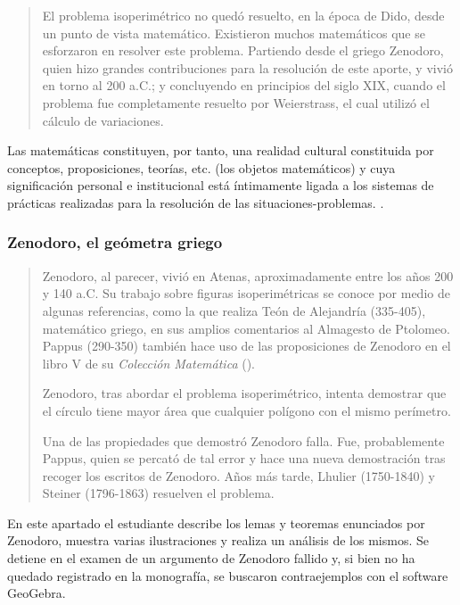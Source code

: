 \begin{quote}
	El problema isoperimétrico no quedó resuelto, en la época de Dido, desde un punto de vista matemático. Existieron muchos matemáticos que se esforzaron en resolver este problema. Partiendo desde el griego Zenodoro, quien hizo grandes contribuciones para la resolución de este aporte, y vivió en torno al 200 a.C.; y concluyendo en principios del siglo XIX, cuando el problema fue completamente resuelto por Weierstrass, el cual utilizó el cálculo de variaciones.
\end{quote}
\vspace{1em}

Las matemáticas constituyen, por tanto, una realidad cultural constituida por conceptos, proposiciones, teorías, etc. (los objetos matemáticos) y cuya significación personal e institucional está íntimamente ligada a los sistemas de prácticas realizadas para la resolución de las situaciones-problemas. \textcite{godino2003}.

\subsubsection{Zenodoro, el geómetra griego}

\begin{quote}
	Zenodoro, al parecer, vivió en Atenas, aproximadamente entre los años 200 y 140 a.C. Su trabajo sobre figuras isoperimétricas se conoce por medio de algunas referencias, como la que realiza Teón de Alejandría (335-405), matemático griego, en sus amplios comentarios al Almagesto de Ptolomeo. Pappus (290-350) también hace uso de las proposiciones de Zenodoro en el libro V de su \textit{Colección Matemática} (\textcite{herrero2011}).
	
	Zenodoro, tras abordar el problema isoperimétrico, intenta demostrar que el círculo tiene mayor área que cualquier polígono con el mismo perímetro.
	
	Una de las propiedades que demostró Zenodoro falla. Fue, probablemente Pappus, quien se percató de tal error y hace una nueva demostración tras recoger los escritos de Zenodoro. Años más tarde, Lhulier (1750-1840) y Steiner (1796-1863) resuelven el problema.
\end{quote}
\vspace{1em}

En este apartado el estudiante describe los lemas y teoremas enunciados por Zenodoro, muestra varias ilustraciones y realiza un análisis de los mismos. Se detiene en el examen de un argumento de Zenodoro fallido y, si bien no ha quedado registrado en la monografía, se buscaron contraejemplos con el software GeoGebra.

